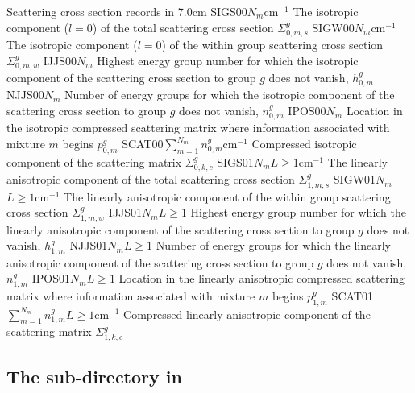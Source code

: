 \begin{DescriptionEnregistrement}{Scattering cross section records in }{7.0cm}
\label{tabl:tablegendre}
\RealEnr
 {SIGS00}{$N_{m}$}{cm$^{-1}$}
 {The isotropic component ($l=0$) of the total scattering cross
  section
  $\Sigma_{0,m,s}^{g}$}
\RealEnr
 {SIGW00}{$N_{m}$}{cm$^{-1}$}
 {The isotropic component ($l=0$) of the within group scattering cross
  section
  $\Sigma_{0,m,w}^{g}$}
\IntEnr
  {IJJS00}{$N_{m}$}
  {Highest energy group number for which 
   the isotropic component of the scattering cross section to group $g$ does not
   vanish, $h_{0,m}^{g}$}
\IntEnr
  {NJJS00}{$N_{m}$}
  {Number of energy groups for which 
   the isotropic component of the scattering cross section to group $g$ does not
   vanish, $n_{0,m}^{g}$}
\IntEnr
  {IPOS00}{$N_{m}$}
  {Location in the isotropic compressed scattering matrix where information associated with mixture 
   $m$ begins $p_{0,m}^{g}$}
\RealEnr
  {SCAT00}{$\sum_{m=1}^{N_{m}} n_{0,m}^{g}$}{cm$^{-1}$}
  {Compressed isotropic component of the scattering matrix
   $\Sigma_{0,k,c}^{g}$}
\OptRealEnr
 {SIGS01}{$N_{m}$}{$L\ge 1$}{cm$^{-1}$}
 {The linearly anisotropic component  of the total scattering cross
  section
  $\Sigma_{1,m,s}^{g}$}
\OptRealEnr
 {SIGW01}{$N_{m}$}{$L\ge 1$}{cm$^{-1}$}
 {The linearly anisotropic component of the within group scattering cross
  section
  $\Sigma_{1,m,w}^{g}$}
\OptIntEnr
  {IJJS01}{$N_{m}$}{$L\ge 1$}
  {Highest energy group number for which 
   the linearly anisotropic component of the scattering cross section to group $g$ does not
   vanish, $h_{1,m}^{g}$}
\OptIntEnr
  {NJJS01}{$N_{m}$}{$L\ge 1$}
  {Number of energy groups for which 
   the linearly anisotropic component of the scattering cross section to group $g$ does not
   vanish, $n_{1,m}^{g}$}
\OptIntEnr
  {IPOS01}{$N_{m}$}{$L\ge 1$}
  {Location in the linearly anisotropic compressed scattering matrix where information
   associated with mixture $m$ begins $p_{1,m}^{g}$}
\OptRealEnr
  {SCAT01}{$\sum_{m=1}^{N_{m}} n_{1,m}^{g}$}{$L\ge 1$}{cm$^{-1}$}
  {Compressed linearly anisotropic component of the scattering matrix
   $\Sigma_{1,k,c}^{g}$}
\end{DescriptionEnregistrement}

\subsection{The  sub-directory in }\label{sect:macroADF}

